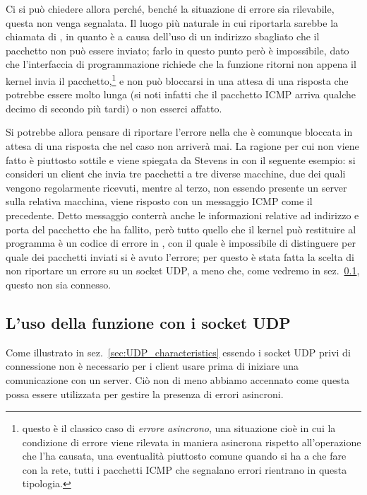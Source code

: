 Ci si può chiedere allora perché, benché la situazione di errore sia
rilevabile, questa non venga segnalata. Il luogo più naturale in cui
riportarla sarebbe la chiamata di , in quanto è a causa dell'uso
di un indirizzo sbagliato che il pacchetto non può essere inviato; farlo in
questo punto però è impossibile, dato che l'interfaccia di programmazione
richiede che la funzione ritorni non appena il kernel invia il
pacchetto,\footnote{questo è il classico caso di \textsl{errore asincrono},
  una situazione cioè in cui la condizione di errore viene rilevata in maniera
  asincrona rispetto all'operazione che l'ha causata, una eventualità
  piuttosto comune quando si ha a che fare con la rete, tutti i pacchetti ICMP
  che segnalano errori rientrano in questa tipologia.} e non può bloccarsi in
una attesa di una risposta che potrebbe essere molto lunga (si noti infatti
che il pacchetto ICMP arriva qualche decimo di secondo più tardi) o non
esserci affatto.

Si potrebbe allora pensare di riportare l'errore nella  che è
comunque bloccata in attesa di una risposta che nel caso non arriverà mai.  La
ragione per cui non viene fatto è piuttosto sottile e viene spiegata da
Stevens in \cite{UNP2} con il seguente esempio: si consideri un client che
invia tre pacchetti a tre diverse macchine, due dei quali vengono regolarmente
ricevuti, mentre al terzo, non essendo presente un server sulla relativa
macchina, viene risposto con un messaggio ICMP come il precedente. Detto
messaggio conterrà anche le informazioni relative ad indirizzo e porta del
pacchetto che ha fallito, però tutto quello che il kernel può restituire al
programma è un codice di errore in , con il quale è impossibile di
distinguere per quale dei pacchetti inviati si è avuto l'errore; per questo è
stata fatta la scelta di non riportare un errore su un socket UDP, a meno che,
come vedremo in sez.~\ref{sec:UDP_connect}, questo non sia connesso.



\subsection{L'uso della funzione  con i socket UDP}
\label{sec:UDP_connect}

Come illustrato in sez.~\ref{sec:UDP_characteristics} essendo i socket UDP
privi di connessione non è necessario per i client usare  prima
di iniziare una comunicazione con un server. Ciò non di meno abbiamo accennato
come questa possa essere utilizzata per gestire la presenza di errori
asincroni.


